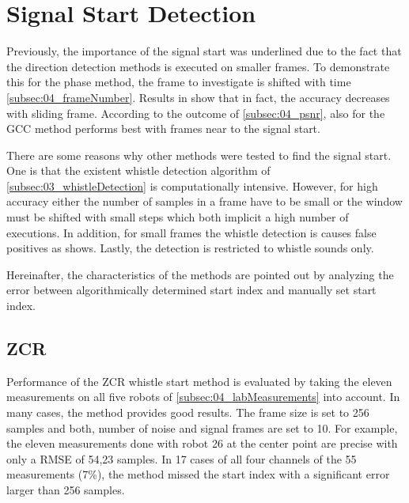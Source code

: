 \section{Signal Start Detection}
\label{sec:04_signalStartDetection}

Previously, the importance of the signal start was underlined
due to the fact that the direction detection methods is
executed on smaller frames.
To demonstrate this for the phase method, the frame to investigate is
shifted with time \cref{subsec:04_frameNumber}.
Results in show that in fact, the accuracy decreases with sliding frame.
According to the outcome of \cref{subsec:04_psnr}, also for the \ac{GCC}
method performs best with frames near to the signal start.

There are some reasons why other methods were tested to find the signal start.
One is that the existent whistle detection algorithm of \cref{subsec:03_whistleDetection}
is computationally intensive.
However, for high accuracy either the number of samples in a frame have to be
small or the window must be shifted with small steps which both implicit
a high number of executions.
In addition, for small frames the whistle detection is causes false positives
as \label{subsec:04_whistleDetection} shows.
Lastly, the detection is restricted to whistle sounds only.

Hereinafter, the characteristics of the methods are pointed out by
analyzing the error between algorithmically determined start index
and manually set start index.


\subsection{ZCR}
\label{subsec:04_zcr}

Performance of the \ac{ZCR} whistle start method is evaluated by taking the eleven
measurements on all five robots of \cref{subsec:04_labMeasurements} into account.
In many cases, the method provides good results.
The frame size is set to 256 samples and both, number of noise and signal frames
are set to 10.
For example, the eleven measurements done with robot 26 at the center point
are precise with only a \ac{RMSE} of 54,23 samples.
In 17 cases of all four channels of the 55 measurements (7\si{\percent}),
the method missed the start index with a significant error larger than 256 samples.


